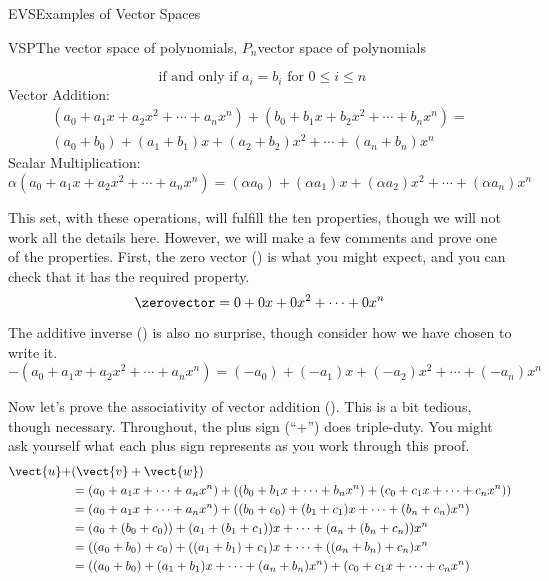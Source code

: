 \begin{subsect}{EVS}{Examples of Vector Spaces}
\begin{example}{VSP}{The vector space of polynomials, $P_n$}{vector space of polynomials}
\begin{para}
\begin{equation*}
\text{ if and only if }a_i=b_i\text{ for }0\leq i\leq n
\end{equation*}
%
Vector Addition:
%
\begin{align*}
(a_0+a_1x+a_2x^2+\cdots+a_nx^n)+(b_0+b_1x+b_2x^2+\cdots+b_nx^n)=\\
(a_0+b_0)+(a_1+b_1)x+(a_2+b_2)x^2+\cdots+(a_n+b_n)x^n
\end{align*}
%
Scalar Multiplication:
\begin{equation*}
\alpha(a_0+a_1x+a_2x^2+\cdots+a_nx^n)=(\alpha a_0)+(\alpha a_1)x+(\alpha a_2)x^2+\cdots+(\alpha a_n)x^n
\end{equation*}
\end{para}
%
\begin{para}This set, with these operations, will fulfill the ten properties, though we will not work all the details here.  However, we will make a few comments and prove one of the properties.  First, the zero vector () is what you might expect, and you can check that it has the required property.
%
\begin{equation*}
\zerovector=0+0x+0x^2+\cdots+0x^n
\end{equation*}
\end{para}
%
\begin{para}The additive inverse () is also no surprise, though consider how we have chosen to write it.
%
\begin{equation*}
-\left(a_0+a_1x+a_2x^2+\cdots+a_nx^n\right)=(-a_0)+(-a_1)x+(-a_2)x^2+\cdots+(-a_n)x^n
\end{equation*}
\end{para}
%
\begin{para}Now let's prove the associativity of vector addition ().  This is a bit tedious, though necessary.  Throughout, the plus sign (``+'') does triple-duty.  You might ask yourself what each plus sign represents as you work through this proof.
%
\begin{align*}
%
\vect{u}+&(\vect{v}+\vect{w})\\
%
&=(a_0+a_1x+\cdots+a_nx^n)+\left((b_0+b_1x+\cdots+b_nx^n)+(c_0+c_1x+\cdots+c_nx^n)\right)\\
%
&=(a_0+a_1x+\cdots+a_nx^n)+((b_0+c_0)+(b_1+c_1)x+\cdots+(b_n+c_n)x^n)\\
%
&=(a_0+(b_0+c_0))+(a_1+(b_1+c_1))x+\cdots+(a_n+(b_n+c_n))x^n\\
%
&=((a_0+b_0)+c_0)+((a_1+b_1)+c_1)x+\cdots+((a_n+b_n)+c_n)x^n\\
%
&=((a_0+b_0)+(a_1+b_1)x+\cdots+(a_n+b_n)x^n)+(c_0+c_1x+\cdots+c_nx^n)\\

\end{align*}
\end{para}
\end{example}
\end{subsect}
